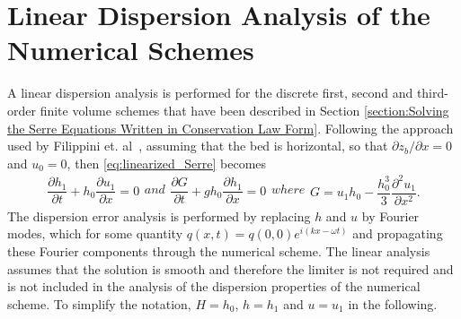 \documentclass[preprint,sort&compress,1p]{article}
\begin{document}
\section{Linear Dispersion Analysis of the Numerical Schemes}\label{section:Semi-discrete Linear Analysis}

 A linear dispersion analysis is performed for the discrete first, second and third-order finite volume schemes that have been described in Section \ref{section:Solving the Serre Equations Written in Conservation Law Form}. Following the approach used by Filippini et. al~\cite{Filippini-etal-2016-381}, assuming that the bed is horizontal, so that $\partial z_b/\partial x = 0$ and $u_0 = 0$, then \eqref{eq:linearized_Serre} becomes
\begin{subequations}
\label{eq:linearized_governing_equations}
\begin{gather}
\dfrac{\partial h_1}{\partial  t} + h_0 \dfrac{\partial u_1}{\partial x} = 0
\end{gather}
and
\begin{gather}
\dfrac{\partial G}{\partial t} +  g h_0 \dfrac{\partial h_1}{\partial x} = 0
\end{gather}
where
\begin{gather}
\label{eq:linearized_Serre_G}
G = u_1 h_0 -  \dfrac{h_0^3}{3} \dfrac{\partial^2 u_1}{\partial x^2}.
\end{gather}
\end{subequations}
The dispersion error analysis is performed by replacing $h$ and $u$ by Fourier modes, which for some quantity $q(x,t) = q(0,0) e^{i(kx -\omega t)}$ and propagating these Fourier components through the numerical scheme. The linear analysis assumes that the solution is smooth and therefore the limiter is not required and is not included in the analysis of the dispersion properties of the numerical scheme. To simplify the notation, $H = h_0$, $ h = h_1$ and $u = u_1$ in the following.
\end{document}
